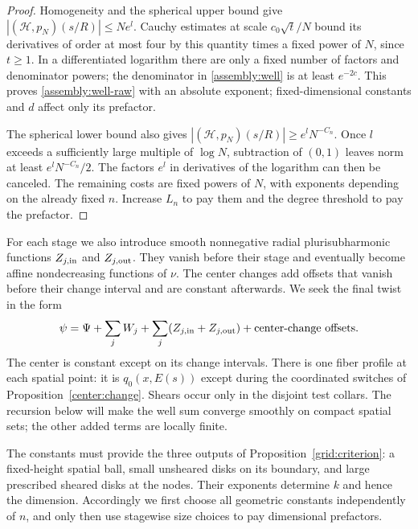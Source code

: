 \begin{proof}
Homogeneity and the spherical upper bound give
$|(\mathcal H,p_N)(s/R)|\leq Ne^l$. Cauchy estimates at scale
$c_0\sqrt t/N$ bound its derivatives of order at most four by this
quantity times a fixed power of $N$, since $t\geq1$. In a differentiated
logarithm there are only a fixed number of factors and denominator
powers; the denominator in \eqref{assembly:well} is at least $e^{-2c}$.
This proves \eqref{assembly:well-raw} with an absolute exponent;
fixed-dimensional constants and $d$ affect only its prefactor.

The spherical lower bound also gives
$|(\mathcal H,p_N)(s/R)|\geq e^lN^{-C_n}$. Once $l$ exceeds a sufficiently
large multiple of $\log N$, subtraction of $(0,1)$ leaves norm at least
$e^lN^{-C_n}/2$. The factors $e^l$ in derivatives of the logarithm can
then be canceled. The remaining costs are fixed powers of $N$, with
exponents depending on the already fixed $n$. Increase $L_n$ to pay
them and the degree threshold to pay the prefactor.
\end{proof}

For each stage we also introduce smooth nonnegative radial
plurisubharmonic functions $Z_{j,\rm in}$ and $Z_{j,\rm out}$. They
vanish before their stage and eventually become affine nondecreasing
functions of $\nu$. The center changes add offsets that vanish before
their change interval and are constant afterwards. We seek the final
twist in the form
\begin{equation}\label{assembly:twist}
 \psi=\Psi+\sum_j W_j+\sum_j(Z_{j,\rm in}+Z_{j,\rm out})
       +\text{center-change offsets}.
\end{equation}
The center is constant except on its change intervals. There is one
fiber profile at each spatial point: it is $q_0(x,E(s))$ except during
the coordinated switches of Proposition~\ref{center:change}.
Shears occur only in the disjoint test collars. The recursion below
will make the well sum converge smoothly on compact spatial sets;
the other added terms are locally finite.

The constants must provide the three outputs of
Proposition~\ref{grid:criterion}: a fixed-height spatial ball, small
unsheared disks on its boundary, and large prescribed sheared disks at
the nodes. Their exponents determine $k$ and hence the dimension.
Accordingly we first choose all geometric constants independently of
$n$, and only then use stagewise size choices to pay dimensional
prefactors.

